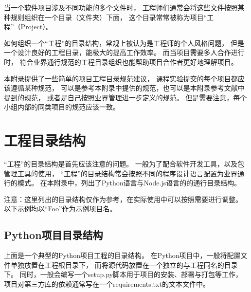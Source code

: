 当一个软件项目涉及不同功能的多个文件时，
工程师们通常会将这些文件按照某种规则组织在一个目录（文件夹）下面，
这个目录常常被称为项目“工程”（Project）。

如何组织一个“工程”的目录结构，常规上被认为是工程师的个人风格问题，
但是一个设计良好的工程目录，能极大的提高工作效率。
而当项目需要多人合作进行时，
符合业界通行规范的工程目录组织也能帮助项目合作者更好地理解项目。

本附录提供了一些简单的项目工程目录规范建议，
课程实验提交的每个项目都应该遵循某种规范，
可以是参考本附录中提供的规范，也可以是本附录参考文献中提到的规范，
或者是自己按照业界管理进一步定义的规范。
但是需要注意，每个小组内部的同类项目的规范应该一致。

\section{工程目录结构}
\label{sec:dir_structure}

“工程”的目录结构是首先应该注意的问题。
一般为了配合软件开发工具，以及包管理工具的使用，
“工程”的目录结构常会按照不同的程序设计语言配置为业界通行的模式。
在本附录中，列出了Python语言与Node.js语言的的通行目录结构。

注意：这里列出的目录结构仅作为参考，在实际使用中可以按照需要进行调整。
以下示例均以“Foo”作为示例项目名。

\subsection{Python项目目录结构}


上面是一个典型的Python项目工程的目录结构。
在Python项目中，一般将配置文件单独放置在工程根目录下，
而将源代码放置在一个独立的与工程同名的目录下。
同时，一般会编写一个setup.py脚本用于项目的安装、部署与打包等工作，
项目对第三方库的依赖通常写在一个requirements.txt的文本文件中。

